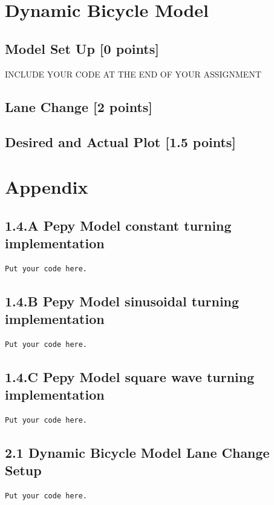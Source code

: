 \documentclass{article}
\begin{document}
\section{Dynamic Bicycle Model}

\subsection{Model Set Up [0 points]}
INCLUDE YOUR CODE AT THE END OF YOUR ASSIGNMENT

\subsection{Lane Change [2 points]}

\subsection{Desired and Actual Plot [1.5 points]}

\newpage
\section{Appendix}
\subsection{1.4.A Pepy Model constant turning implementation}
\begin{verbatim}
Put your code here.
\end{verbatim}

\subsection{1.4.B Pepy Model sinusoidal turning implementation}
\begin{verbatim}
Put your code here.
\end{verbatim}

\subsection{1.4.C Pepy Model square wave turning implementation}
\begin{verbatim}
Put your code here.
\end{verbatim}

\subsection{2.1 Dynamic Bicycle Model Lane Change Setup}
\begin{verbatim}
Put your code here.
\end{verbatim}
\end{document}
